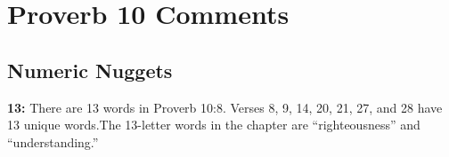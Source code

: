 \section{Proverb 10 Comments}

\subsection{Numeric Nuggets}
\textbf{13:} There are 13 words in Proverb 10:8. Verses 8, 9, 14, 20, 21, 27, and 28 have 13 unique words.The 13-letter words in the chapter are ``righteousness'' and ``understanding.''  

